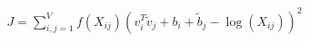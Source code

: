 \documentclass[preview]{standalone}
\begin{document}
\begin{align*}
J = \sum_{i,j=1}^{V} f(X_{ij}) (v_i^T \tilde{v}_j + b_i + \tilde{b}_j - \log(X_{ij}))^2
\end{align*}
\end{document}
